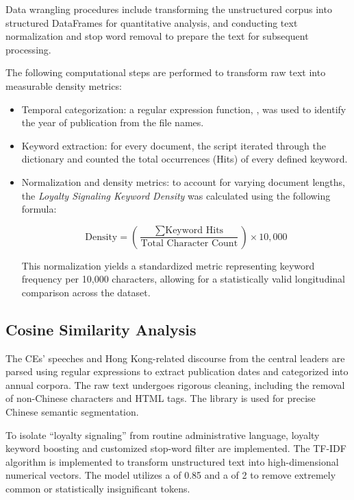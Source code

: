 \documentclass[9pt,a4paper,twocolumn,twoside]{rho-class/rho}
\providecommand{\inlinecode}[1]{#1}
\renewcommand{\inlinecode}[1]{%
    \begingroup
    \setlength{\fboxsep}{1.5pt}%
    \colorbox{gray!15}{\texttt{\detokenize{#1}}}%
    \endgroup
}
\begin{document}
        Data wrangling procedures include transforming the unstructured corpus into structured DataFrames for quantitative analysis, and conducting text normalization and stop word removal to prepare the text for subsequent processing.

        The following computational steps are performed to transform raw text into measurable density metrics:
        
        \begin{itemize}
            \item Temporal categorization: a regular expression function, \inlinecode{extract_year}, was used to identify the year of publication from the file names.
            \item Keyword extraction: for every document, the script iterated through the dictionary and counted the total occurrences (Hits) of every defined keyword.
            \item Normalization and density metrics: to account for varying document lengths, the \textit{Loyalty Signaling Keyword Density} was calculated using the following formula:
            
            \begin{equation}
                \text{Density} = \left( \frac{\sum \text{Keyword Hits}}{\text{Total Character Count}} \right) \times 10,000
            \end{equation}
            
            This normalization yields a standardized metric representing keyword frequency per 10,000 characters, allowing for a statistically valid longitudinal comparison across the dataset.
            
        \end{itemize}


	\subsection{Cosine Similarity Analysis}

        The CEs' speeches and Hong Kong-related discourse from the central leaders are parsed using regular expressions to extract publication dates and categorized into annual corpora. 
        The raw text undergoes rigorous cleaning, including the removal of non-Chinese characters and HTML tags. The \inlinecode{jieba} library is used for precise Chinese semantic segmentation.

        To isolate ``loyalty signaling'' from routine administrative language, loyalty keyword boosting and customized stop-word filter are implemented. The TF-IDF algorithm is implemented to 
        transform unstructured text into high-dimensional numerical vectors. The model utilizes a \inlinecode{max_df} of 0.85 and a \inlinecode{min_df} of 2 to remove extremely common or statistically insignificant tokens.
\end{document}
